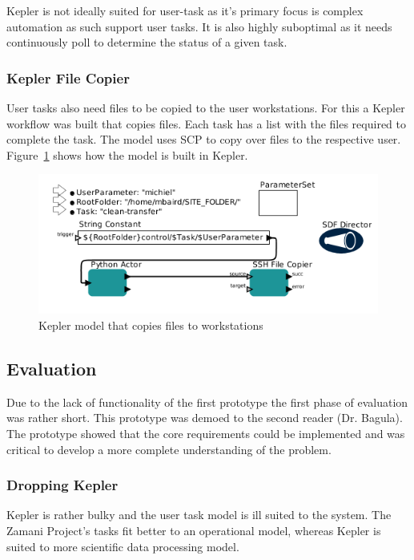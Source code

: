 \documentclass[12pt,a4paper]{report}
\begin{document}
Kepler is not ideally suited for user-task as it's primary focus is complex
automation as such support user tasks. It is also highly suboptimal as it needs
continuously poll to determine the status of a given task.

\subsubsection{Kepler File Copier}
User tasks also need files to be copied to the user workstations. For this
a Kepler workflow was built that copies files. Each task has a list with the
files required to complete the task. The model uses SCP to copy over files
to the respective user. Figure~\ref{kepler_file_model} shows how the model
is built in Kepler.

\begin{figure}[!h]
    \begin{center}
        \includegraphics[scale=0.6]{figures/kepler_file.png}
    \end{center}
    \caption{Kepler model that copies files to workstations}
    \label{kepler_file_model}
\end{figure}


\subsection{Evaluation}
Due to the lack of functionality of the first prototype the first
phase of evaluation was rather short. This prototype was demoed to
the second reader (Dr. Bagula). The prototype showed that the core
requirements could be implemented and was critical to develop a more
complete understanding of the problem.


\subsubsection{Dropping Kepler}
Kepler is rather bulky and the user task model is ill suited to the system.
The Zamani Project's tasks fit better to an operational model, whereas Kepler
is suited to more scientific data processing model.
\end{document}
